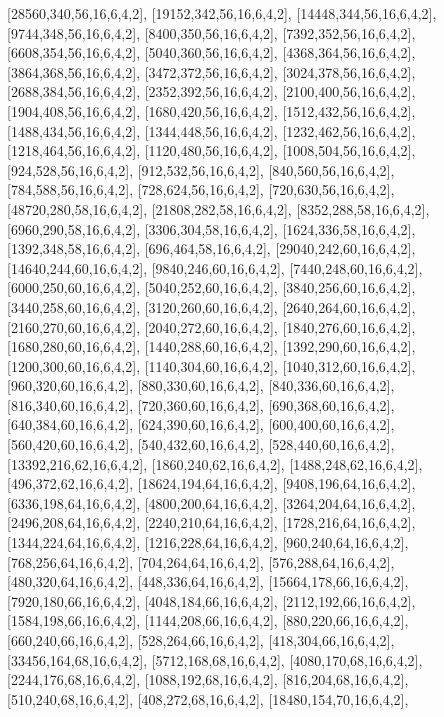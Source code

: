 \documentclass[12pt]{amsart}
\begin{document}
[28560,340,56,16,6,4,2],   [19152,342,56,16,6,4,2],   [14448,344,56,16,6,4,2],   [9744,348,56,16,6,4,2],   [8400,350,56,16,6,4,2],   [7392,352,56,16,6,4,2],
[6608,354,56,16,6,4,2],   [5040,360,56,16,6,4,2],   [4368,364,56,16,6,4,2],   [3864,368,56,16,6,4,2],   [3472,372,56,16,6,4,2],   [3024,378,56,16,6,4,2],
[2688,384,56,16,6,4,2],   [2352,392,56,16,6,4,2],   [2100,400,56,16,6,4,2],   [1904,408,56,16,6,4,2],   [1680,420,56,16,6,4,2],   [1512,432,56,16,6,4,2],
[1488,434,56,16,6,4,2],   [1344,448,56,16,6,4,2],   [1232,462,56,16,6,4,2],   [1218,464,56,16,6,4,2],   [1120,480,56,16,6,4,2],   [1008,504,56,16,6,4,2],
[924,528,56,16,6,4,2],   [912,532,56,16,6,4,2],   [840,560,56,16,6,4,2],   [784,588,56,16,6,4,2],   [728,624,56,16,6,4,2],   [720,630,56,16,6,4,2],
[48720,280,58,16,6,4,2],   [21808,282,58,16,6,4,2],   [8352,288,58,16,6,4,2],   [6960,290,58,16,6,4,2],   [3306,304,58,16,6,4,2],   [1624,336,58,16,6,4,2],
[1392,348,58,16,6,4,2],   [696,464,58,16,6,4,2],   [29040,242,60,16,6,4,2],   [14640,244,60,16,6,4,2],   [9840,246,60,16,6,4,2],   [7440,248,60,16,6,4,2],
[6000,250,60,16,6,4,2],   [5040,252,60,16,6,4,2],   [3840,256,60,16,6,4,2],   [3440,258,60,16,6,4,2],   [3120,260,60,16,6,4,2],   [2640,264,60,16,6,4,2],
[2160,270,60,16,6,4,2],   [2040,272,60,16,6,4,2],   [1840,276,60,16,6,4,2],   [1680,280,60,16,6,4,2],   [1440,288,60,16,6,4,2],   [1392,290,60,16,6,4,2],
[1200,300,60,16,6,4,2],   [1140,304,60,16,6,4,2],   [1040,312,60,16,6,4,2],   [960,320,60,16,6,4,2],   [880,330,60,16,6,4,2],   [840,336,60,16,6,4,2],
[816,340,60,16,6,4,2],   [720,360,60,16,6,4,2],   [690,368,60,16,6,4,2],   [640,384,60,16,6,4,2],   [624,390,60,16,6,4,2],   [600,400,60,16,6,4,2],
[560,420,60,16,6,4,2],   [540,432,60,16,6,4,2],   [528,440,60,16,6,4,2],   [13392,216,62,16,6,4,2],   [1860,240,62,16,6,4,2],   [1488,248,62,16,6,4,2],
[496,372,62,16,6,4,2],   [18624,194,64,16,6,4,2],   [9408,196,64,16,6,4,2],   [6336,198,64,16,6,4,2],   [4800,200,64,16,6,4,2],   [3264,204,64,16,6,4,2],
[2496,208,64,16,6,4,2],   [2240,210,64,16,6,4,2],   [1728,216,64,16,6,4,2],   [1344,224,64,16,6,4,2],   [1216,228,64,16,6,4,2],   [960,240,64,16,6,4,2],
[768,256,64,16,6,4,2],   [704,264,64,16,6,4,2],   [576,288,64,16,6,4,2],   [480,320,64,16,6,4,2],   [448,336,64,16,6,4,2],   [15664,178,66,16,6,4,2],
[7920,180,66,16,6,4,2],   [4048,184,66,16,6,4,2],   [2112,192,66,16,6,4,2],   [1584,198,66,16,6,4,2],   [1144,208,66,16,6,4,2],   [880,220,66,16,6,4,2],
[660,240,66,16,6,4,2],   [528,264,66,16,6,4,2],   [418,304,66,16,6,4,2],   [33456,164,68,16,6,4,2],   [5712,168,68,16,6,4,2],   [4080,170,68,16,6,4,2],
[2244,176,68,16,6,4,2],   [1088,192,68,16,6,4,2],   [816,204,68,16,6,4,2],   [510,240,68,16,6,4,2],   [408,272,68,16,6,4,2],   [18480,154,70,16,6,4,2],
\end{document}
